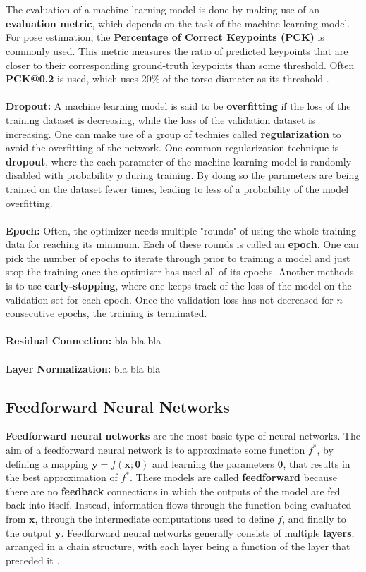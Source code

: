 \documentclass[./main.tex]{subfiles}
\begin{document}
\\
\\
The evaluation of a machine learning model is done by making use of an \textbf{evaluation metric}, which depends on the task of the machine learning model. For pose estimation, the \textbf{Percentage of Correct Keypoints (PCK)} is commonly used. This metric measures the ratio of predicted keypoints that are closer to their corresponding ground-truth keypoints than some threshold. Often \textbf{PCK@0.2} is used, which uses $20\%$ of the torso diameter as its threshold \cite{https://doi.org/10.48550/arxiv.2001.08095}.
\\
\\
\noindent \textbf{Dropout:} A machine learning model is said to be \textbf{overfitting} if the loss of the training dataset is decreasing, while the loss of the validation dataset is increasing. One can make use of a group of technies called \textbf{regularization} to avoid the overfitting of the network. One common regularization technique is \textbf{dropout}, where the each parameter of the machine learning model is randomly disabled with probability $p$ during training. By doing so the parameters are being trained on the dataset fewer times, leading to less of a probability of the model overfitting.
\\
\\
\noindent \textbf{Epoch:} Often, the optimizer needs multiple "rounds" of using the whole training data for reaching its minimum. Each of these rounds is called an \textbf{epoch}. One can pick the number of epochs to iterate through prior to training a model and just stop the training once the optimizer has used all of its epochs. Another methods is to use \textbf{early-stopping}, where one keeps track of the loss of the model on the validation-set for each epoch. Once the validation-loss has not decreased for $n$ consecutive epochs, the training is terminated.
\\
\\
\noindent \textbf{Residual Connection:} bla bla bla
\\
\\
\noindent \textbf{Layer Normalization:} bla bla bla

\subsection{Feedforward Neural Networks}
\textbf{Feedforward neural networks} are the most basic type of neural networks. The aim of a feedforward neural network is to approximate some function $f^*$, by defining a mapping $\bm{y} = f(\bm{x}; \bm{\theta})$ and learning the parameters $\bm{\theta}$, that results in the best approximation of $f^*$. These models are called \textbf{feedforward} because there are no \textbf{feedback} connections in which the outputs of the model are fed back into itself. Instead, information flows through the function being evaluated from $\bm{x}$, through the intermediate computations used to define $f$, and finally to the output $\bm{y}$. Feedforward neural networks generally consists of multiple \textbf{layers}, arranged in a chain structure, with each layer being a function of the layer that preceded it \cite{DL_book}. 
\end{document}
